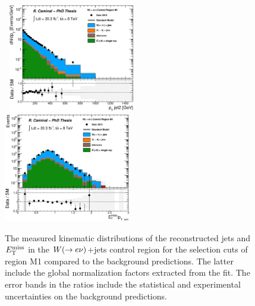 \begin{figure}[!ht]
\begin{center}
{    }
    \mbox{
      \includegraphics[width=0.495\textwidth]{MonojetAnalysis/Figures/plot_Stop_A6_CRele_pt2_fitted.eps}
      \includegraphics[width=0.495\textwidth]{MonojetAnalysis/Figures/plot_Stop_A6_CRele_metpt1_fitted.eps}
    }
  \end{center}
  \caption[Kinematic distributions of the reconstructed jets and $\met$ in the $\wen$+jets control region for the selection cuts of region M1, after the normalization factors extracted from the fit have been applied.]{The measured kinematic distributions of the reconstructed jets and $\met$ in the $\wen$+jets control region for the selection cuts of region M1 compared to the background predictions. The latter include the global normalization factors extracted from the fit. The error bands in the ratios include the statistical and experimental uncertainties on the background predictions.}
  \label{fig:Plot_M1_CRele_Jetkinematics}
\end{figure}

